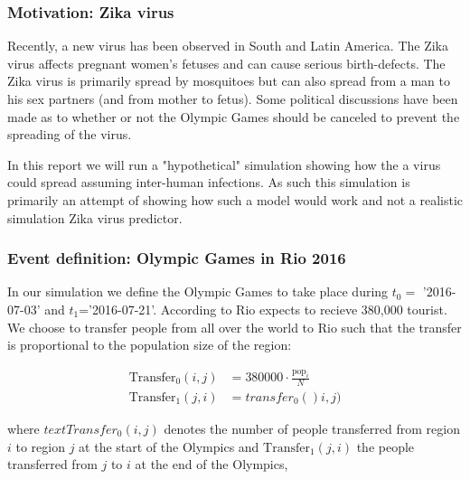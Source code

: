 \subsubsection{Motivation: Zika virus}
Recently, a new virus has been observed in South and Latin America. The Zika virus affects pregnant women's fetuses and can cause serious birth-defects. The Zika virus is primarily spread by mosquitoes but can also spread from a man to his sex partners (and from mother to fetus). Some political discussions have been made as to whether or not the Olympic Games should be canceled to prevent the spreading of the virus. 

In this report we will run a "hypothetical" simulation showing how the a virus could spread assuming inter-human infections. As such this simulation is primarily an attempt of showing how such a model would work and not a realistic simulation Zika virus predictor.

\subsubsection{Event definition: Olympic Games in Rio 2016}
In our simulation we define the Olympic Games to take place during $t_0=$ '2016-07-03' and $t_1$='2016-07-21'. According to \cite{theguardian-olympics} Rio expects to recieve 380,000 tourist. We choose to transfer people from all over the world to Rio such that the transfer is proportional to the population size of the region:

\begin{align}
	\text{Transfer}_0(i, j) &= 380000 \cdot \frac{ \text{pop}_i}{N} \\
	\text{Transfer}_1(j, i) &= transfer_0()i, j)
\end{align}

where $text{Transfer}_0(i, j) $ denotes the number of people transferred from region $i$ to region $j$ at the start of the Olympics and $ \text{Transfer}_1(j, i) $ the people transferred from $j$ to $i$ at the end of the Olympics,